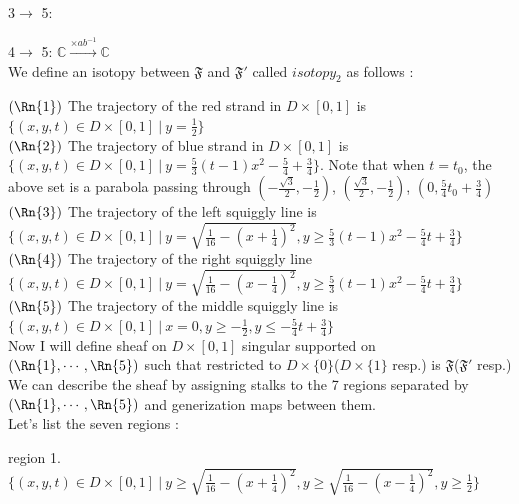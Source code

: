 3$\rightarrow$ 5: 

4$\rightarrow$ 5: $\mathbb{C}\xrightarrow{\times ab^{-1}}\mathbb{C}$\\

We define an isotopy between $\mathfrak{F}$ and $\mathfrak{F}'$ called $isotopy_2$ as follows :

$(\Rn{1})$ The trajectory of the red strand in $D\times [0,1]$ is $\{(x,y,t)\in D\times [0,1]~|~ y = \frac{1}{2}\}$\\
$(\Rn{2})$ The trajectory of blue strand in $D\times [0,1]$ is $\{(x,y,t)\in D\times [0,1]~|~ y = \frac{5}{3}(t-1)x^2 - \frac{5}{4} + \frac{3}{4}\}$. Note that when $t=t_0$, the above set is a parabola passing through $(-\frac{\sqrt{3}}{2}, -\frac{1}{2})$, $(\frac{\sqrt{3}}{2}, -\frac{1}{2})$, $(0, \frac{5}{4}t_0 + \frac{3}{4})$\\

$(\Rn{3})$ The trajectory of the left squiggly line is $\{(x,y,t)\in D\times [0,1]~|~y = \sqrt{\frac{1}{16}-(x+\frac{1}{4})^2}, y \geq \frac{5}{3}(t-1)x^2 - \frac{5}{4}t + \frac{3}{4} \}$\\

$(\Rn{4})$ The trajectory of the right squiggly line $\{(x,y,t)\in D\times [0,1]~|~y = \sqrt{\frac{1}{16}-(x-\frac{1}{4})^2}, y \geq \frac{5}{3}(t-1)x^2 - \frac{5}{4}t + \frac{3}{4} \}$\\

$(\Rn{5})$ The trajectory of the middle squiggly line is$\{(x,y,t)\in D\times [0,1]~|~x=0,y\geq -\frac{1}{2}, y \leq -\frac{5}{4}t + \frac{3}{4} \}$\\

Now I will define sheaf on $D\times [0,1]$ singular supported on $(\Rn{1},\cdots,\Rn{5})$ such that restricted to $D\times\{0\}$($D\times\{1\}$ resp.) is $\mathfrak{F}$($\mathfrak{F}'$ resp.)\\

We can describe the sheaf by assigning stalks to the 7 regions separated by $(\Rn{1},\cdots,\Rn{5})$ and generization maps between them.\\

Let's list the seven regions :

region 1.$\{(x,y,t)\in D\times [0,1]~|~y \geq \sqrt{\frac{1}{16}-(x+\frac{1}{4})^2}, y \geq \sqrt{\frac{1}{16}-(x-\frac{1}{4})^2}, y\geq \frac{1}{2} \}$\\

